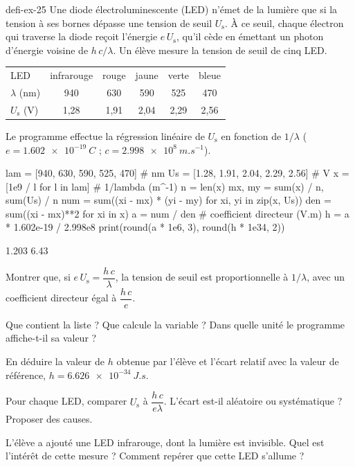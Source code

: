 \begin{blocEdition}{defi-ex-25}
Une diode électroluminescente (LED) n'émet de la lumière que si la tension à ses bornes dépasse une tension de seuil
$U_\mathrm{s}$. À ce seuil, chaque électron qui traverse la diode reçoit l'énergie $e\,U_\mathrm{s}$, qu'il cède en émettant un photon
d'énergie voisine de $h\,c/\lambda$. Un élève mesure la tension de seuil de cinq LED.
\begin{center}
\begin{tabular}{lccccc}
\toprule
LED & infrarouge & rouge & jaune & verte & bleue \\
$\lambda$ (nm) & 940 & 630 & 590 & 525 & 470 \\
$U_\mathrm{s}$ (V) & 1,28 & 1,91 & 2,04 & 2,29 & 2,56 \\
\bottomrule
\end{tabular}
\end{center}
Le programme effectue la régression linéaire de $U_\mathrm{s}$ en fonction de $1/\lambda$ ($e=\qty{1,602e-19}{C}$ ;
$c=\qty{2,998e8}{m.s^{-1}}$).
\begin{python}
lam = [940, 630, 590, 525, 470]          # nm
Us = [1.28, 1.91, 2.04, 2.29, 2.56]      # V
x = [1e9 / l for l in lam]               # 1/lambda (m^-1)
n = len(x)
mx, my = sum(x) / n, sum(Us) / n
num = sum((xi - mx) * (yi - my) for xi, yi in zip(x, Us))
den = sum((xi - mx)**2 for xi in x)
a = num / den                            # coefficient directeur (V.m)
h = a * 1.602e-19 / 2.998e8
print(round(a * 1e6, 3), round(h * 1e34, 2))
\end{python}
\begin{console}
1.203 6.43
\end{console}
\begin{questions}
\item Montrer que, si $e\,U_\mathrm{s}=\dfrac{h\,c}{\lambda}$, la tension de seuil est proportionnelle à $1/\lambda$, avec un coefficient
directeur égal à $\dfrac{h\,c}{e}$.
\item Que contient la liste  ? Que calcule la variable  ? Dans quelle unité le programme affiche-t-il sa
valeur ?
\item En déduire la valeur de $h$ obtenue par l'élève et l'écart relatif avec la valeur de référence,
$h=\qty{6,626e-34}{J.s}$.
\item Pour chaque LED, comparer $U_\mathrm{s}$ à $\dfrac{h\,c}{e\lambda}$. L'écart est-il aléatoire ou systématique ? Proposer des causes.
\item L'élève a ajouté une LED infrarouge, dont la lumière est invisible. Quel est l'intérêt de cette mesure ? Comment
repérer que cette LED s'allume ?
\end{questions}
\end{blocEdition}

